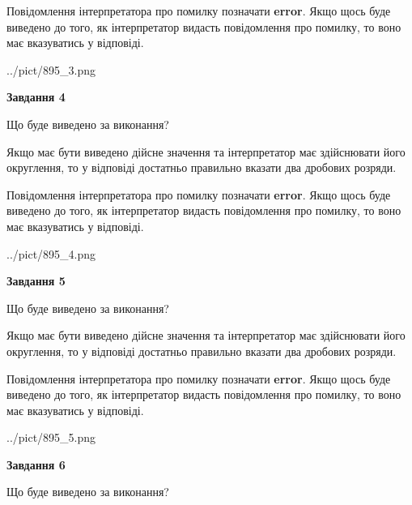 \documentclass[12pt, ukrainian]{article}
\begin{document}
{\begin {Large}
Повідомлення інтерпретатора про помилку позначати \textbf{error}.
Якщо щось буде виведено до того, як інтерпретатор видасть повідомлення про помилку, 
то воно має вказуватись у відповіді. \par

\begin{center}
	{../pict/895_3.png}
\end{center}
\newpage

{\begin {center}\textbf{Завдання 4}\end {center}}\par
Що буде виведено за виконання? \par

Якщо має бути виведено дійсне значення та інтерпретатор має здійснювати його округлення, 
то у відповіді достатньо правильно вказати два дробових розряди.

Повідомлення інтерпретатора про помилку позначати \textbf{error}.
Якщо щось буде виведено до того, як інтерпретатор видасть повідомлення про помилку, 
то воно має вказуватись у відповіді. \par

\begin{center}
	{../pict/895_4.png}
\end{center}
\newpage

{\begin {center}\textbf{Завдання 5}\end {center}}\par
Що буде виведено за виконання? \par

Якщо має бути виведено дійсне значення та інтерпретатор має здійснювати його округлення, 
то у відповіді достатньо правильно вказати два дробових розряди.

Повідомлення інтерпретатора про помилку позначати \textbf{error}.
Якщо щось буде виведено до того, як інтерпретатор видасть повідомлення про помилку, 
то воно має вказуватись у відповіді. \par

\begin{center}
	{../pict/895_5.png}
\end{center}
\newpage

{\begin {center}\textbf{Завдання 6}\end {center}}\par
Що буде виведено за виконання? \par


\end{Large}}
\end{document}
